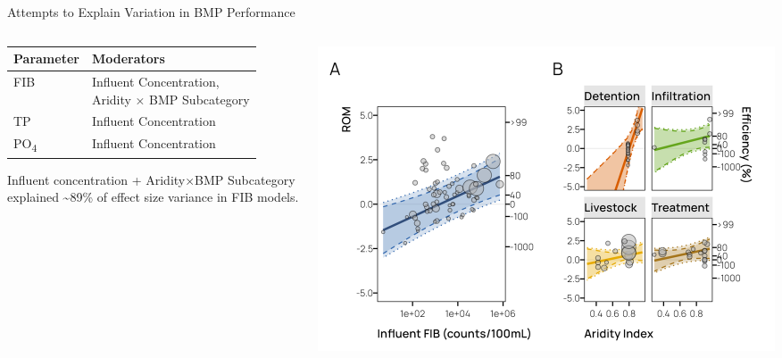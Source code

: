 \documentclass[
  ignorenonframetext,
  aspectratio=169,
]{beamer}
\begin{document}
\begin{frame}{Attempts to Explain Variation in BMP Performance}
\label{attempts-to-explain-variation-in-bmp-performance}
\begin{columns}[T]
\begin{column}{0.4\textwidth}
\begin{tabular}[t]{l|l}
\hline
Parameter & Moderators\\
\hline
FIB & \makecell[l]{Influent Concentration,\\Aridity × BMP Subcategory}\\
\hline
TP & Influent Concentration\\
\hline
PO\textsubscript{4} & Influent Concentration\\
\hline
\end{tabular}

Influent concentration + Aridity×BMP Subcategory explained
\textasciitilde89\% of effect size variance in FIB models.
\end{column}

\begin{column}{0.6\textwidth}
\includegraphics[width=1\textwidth,height=\textheight]{Schramm-UCOWR-2024_files/figure-beamer/p5-1.png}
\end{column}
\end{columns}
\end{frame}
\end{document}
